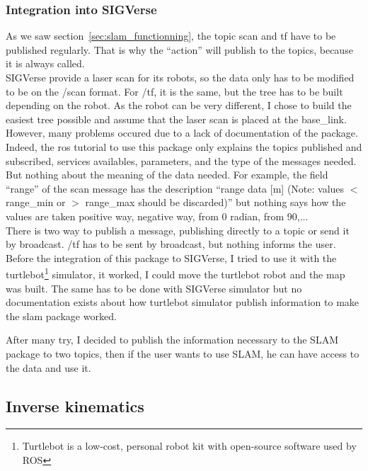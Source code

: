 \subsubsection{Integration into SIGVerse}
As we saw section~\ref{sec:slam_functionning}, the topic scan and tf have to be published regularly. That is why the ``action'' will publish to the topics, because it is always called.\\
SIGVerse provide a laser scan for its robots, so the data only has to be modified to be on the /scan format.
For /tf, it is the same, but the tree has to be built depending on the robot. As the robot can be very different, I chose to build the easiest tree possible and assume that the laser scan is placed at the base\_link.\\

However, many problems occured due to a lack of documentation of the package. Indeed, the ros tutorial to use this package only explains the topics published and subscribed, services availables, parameters, and the type of the messages needed. But nothing about the meaning of the data needed. For example, the field ``range'' of the scan message has the description ``range data [m] (Note: values $<$ range\_min or $>$ range\_max should be discarded)'' but nothing says how the values are taken positive way, negative way, from 0 radian, from 90,...\\

There is two way to publish a message, publishing directly to a topic or send it by broadcast. /tf has to be sent by broadcast, but nothing informs the user.\\

Before the integration of this package to SIGVerse, I tried to use it with the turtlebot\footnote{Turtlebot is a low-cost, personal robot kit with open-source software used by ROS} simulator, it worked, I could move the turtlebot robot and the map was built. The same has to be done with SIGVerse simulator but no documentation exists about how turtlebot simulator publish information to make the slam package worked.

After many try, I decided to publish the information necessary to the SLAM package to two topics, then if the user wants to use SLAM, he can have access to the data and use it.

\subsection{Inverse kinematics}\label{subsec:ik}
